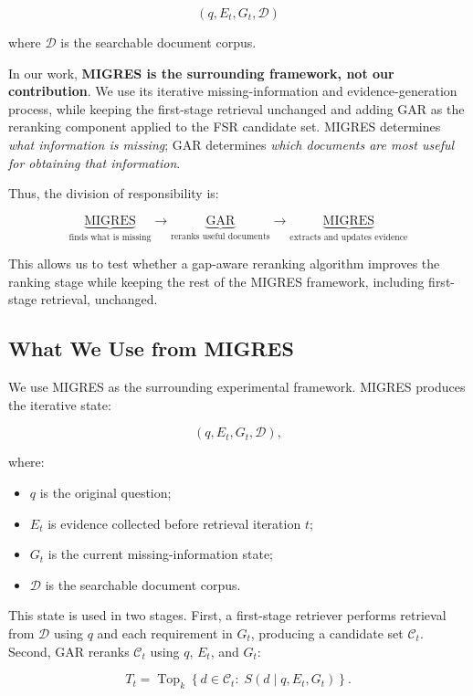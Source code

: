 \documentclass[11pt,a4paper]{article}
\begin{document}
\[
\boxed{
(q,E_t,G_t,\mathcal{D})
}
\]

where $\mathcal{D}$ is the searchable document corpus.

In our work, \textbf{MIGRES is the surrounding framework, not our contribution}. We use its iterative missing-information and evidence-generation process, while keeping the first-stage retrieval unchanged and adding GAR as the reranking component applied to the FSR candidate set. MIGRES determines \emph{what information is missing}; GAR determines \emph{which documents are most useful for obtaining that information}.

Thus, the division of responsibility is:

\[
\boxed{
\underbrace{\text{MIGRES}}_{\text{finds what is missing}}
\rightarrow
\underbrace{\text{GAR}}_{\text{reranks useful documents}}
\rightarrow
\underbrace{\text{MIGRES}}_{\text{extracts and updates evidence}}
}
\]

This allows us to test whether a gap-aware reranking algorithm improves the ranking stage while keeping the rest of the MIGRES framework, including first-stage retrieval, unchanged.

\subsection{What We Use from MIGRES}

We use MIGRES as the surrounding experimental framework. MIGRES produces the iterative state:

\[
(q,E_t,G_t,\mathcal{D}),
\]

where:

\begin{itemize}[leftmargin=1.5em]
\item $q$ is the original question;
\item $E_t$ is evidence collected before retrieval iteration $t$;
\item $G_t$ is the current missing-information state;
\item $\mathcal{D}$ is the searchable document corpus.
\end{itemize}

This state is used in two stages. First, a first-stage retriever performs retrieval from $\mathcal{D}$ using $q$ and each requirement in $G_t$, producing a candidate set $\mathcal{C}_t$. Second, GAR reranks $\mathcal{C}_t$ using $q$, $E_t$, and $G_t$:

\[
T_t=\operatorname{Top}_{k}\!\left\{d\in\mathcal{C}_t:\;S(d\mid q,E_t,G_t)\right\}.
\]
\end{document}
